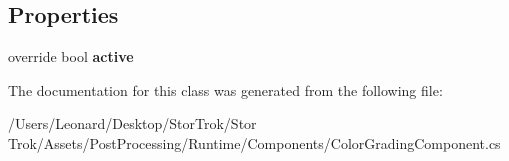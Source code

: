 \subsection*{Properties}
\begin{DoxyCompactItemize}
\item 
\mbox{\label{class_unity_engine_1_1_post_processing_1_1_color_grading_component_acc86c87eda1936a230afa7c7afad7be9}} 
override bool {\bfseries active}
\end{DoxyCompactItemize}


The documentation for this class was generated from the following file\+:\begin{DoxyCompactItemize}
\item 
/\+Users/\+Leonard/\+Desktop/\+Stor\+Trok/\+Stor Trok/\+Assets/\+Post\+Processing/\+Runtime/\+Components/Color\+Grading\+Component.\+cs\end{DoxyCompactItemize}
